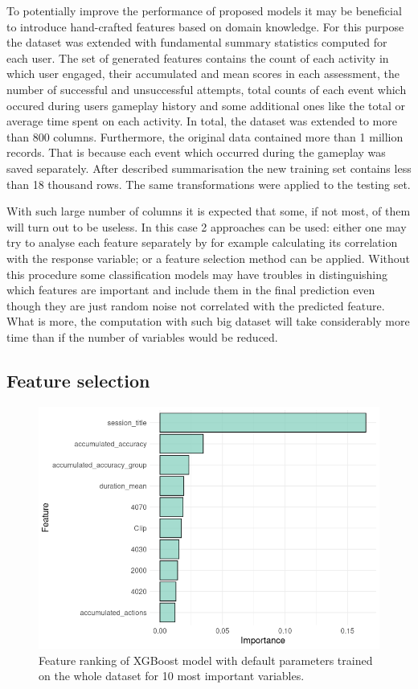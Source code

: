 \documentclass[fleqn,10pt]{SelfArx} %
\begin{document}
To potentially improve the performance of proposed models it may be beneficial to introduce hand-crafted features based on domain knowledge.
For this purpose the dataset was extended with fundamental summary statistics computed for each user.
The set of generated features contains the count of each activity in which user engaged, their accumulated and mean scores in each assessment, the number of successful and unsuccessful attempts, total counts of each event which occured during users gameplay history and some additional ones like the total or average time spent on each activity.
In total, the dataset was extended to more than 800 columns.
Furthermore, the original data contained more than 1 million records.
That is because each event which occurred during the gameplay was saved separately.
After described summarisation the new training set contains less than 18 thousand rows.
The same transformations were applied to the testing set.

With such large number of columns it is expected that some, if not most, of them will turn out to be useless.
In this case 2 approaches can be used: either one may try to analyse each feature separately by for example calculating its correlation with the response variable; or a feature selection method can be applied.
Without this procedure some classification models may have troubles in distinguishing which features are important and include them in the final prediction even though they are just random noise not correlated with the predicted feature.
What is more, the computation with such big dataset will take considerably more time than if the number of variables would be reduced.

\subsection{Feature selection}

\begin{figure}
    \centering
    \includegraphics[width=\linewidth]{images/feature_importance.png}
    \caption{Feature ranking of XGBoost model with default parameters trained on the whole dataset for 10 most important variables.}
    \label{fig:feature-importance}
\end{figure}
\end{document}
